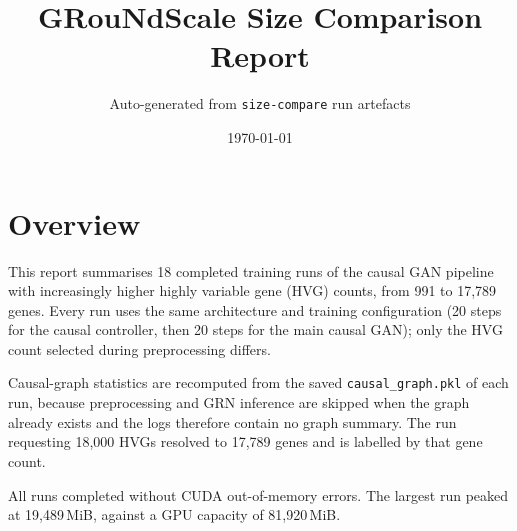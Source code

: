 \documentclass[11pt]{article}
\title{GRouNdScale Size Comparison Report}
\author{Auto-generated from \texttt{size-compare} run artefacts}
\date{\today}
\begin{document}
\maketitle
\section{Overview}
This report summarises 18 completed training runs of the causal GAN pipeline with increasingly higher highly variable gene (HVG) counts, from 991 to 17,789 genes. Every run uses the same architecture and training configuration (20 steps for the causal controller, then 20 steps for the main causal GAN); only the HVG count selected during preprocessing differs.

Causal-graph statistics are recomputed from the saved \texttt{causal\_graph.pkl} of each run, because preprocessing and GRN inference are skipped when the graph already exists and the logs therefore contain no graph summary. The run requesting 18{,}000 HVGs resolved to 17,789 genes and is labelled by that gene count.

All runs completed without CUDA out-of-memory errors. The largest run peaked at 19,489\,MiB, against a GPU capacity of 81,920\,MiB.
\end{document}
